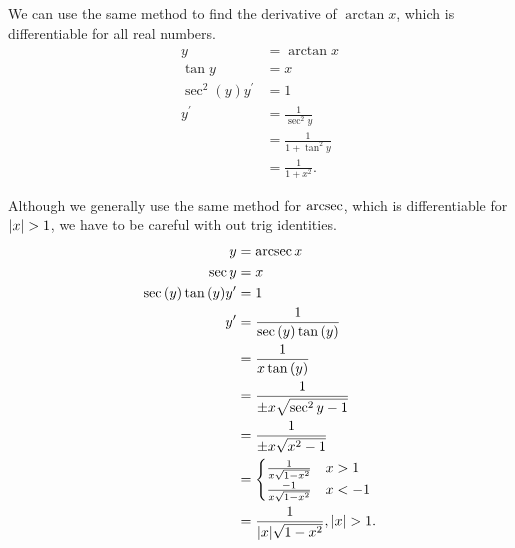 \noindent
We can use the same method to find the derivative of $\arctan{x}$, which is differentiable for all real numbers.
\begin{align*}
	y &= \arctan{x} \\
	\tan{y} &= x \\
	\sec^2{(y)}y^\prime &= 1 \\
	y^\prime &= \frac{1}{\sec^2{y}} \\
	&= \frac{1}{1+\tan^2{y}} \\
	&= \frac{1}{1+x^2}.
\end{align*}

\noindent
Although we generally use the same method for $\operatorname{arcsec}$, which is differentiable for $\lvert x \rvert>1$, we have to be careful with out trig identities.
\begin{align*}
	y &= \operatorname{arcsec}{x} \\
	\sec{y} &= x \\
	\sec{(y)}\tan{(y)}y^\prime &= 1 \\
	y^\prime &= \frac{1}{\sec{(y)}\tan{(y)}} \\
	&= \frac{1}{x\tan{(y)}} \\
	&= \frac{1}{\pm x\sqrt{\sec^2{y}-1}} \\
	&= \frac{1}{\pm x\sqrt{x^2-1}} \\
	&= \begin{cases}
		\frac{1}{x\sqrt{1-x^2}} & x > 1 \\
		\frac{-1}{x\sqrt{1-x^2}} & x < -1
	\end{cases} \\
	&= \frac{1}{\lvert x \rvert\sqrt{1-x^2}}, \lvert x \rvert > 1.
\end{align*}

